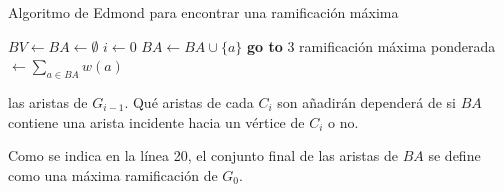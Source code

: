 \documentclass[10pt,a5paper]{book}
\begin{document}
\vfill
\pagebreak
\begin{algorithm}[H]
\caption{Algoritmo de Edmond para encontrar una ramificación máxima}
\BlankLine
\dontprintsemicolon
$BV \leftarrow BA \leftarrow \emptyset$\;
$i \leftarrow 0$\;
{
}
{
}
$BA \leftarrow BA \cup \{a\}$\;
\textbf{go to} 3\;
{
  ramificación máxima ponderada $\leftarrow \sum_{a \in BA}^{} w(a)$
}
\end{algorithm}

las aristas de $G_{i-1}$. Qué aristas de cada $C_i$ son añadirán dependerá de si $BA$ contiene una arista incidente hacia un vértice de $C_i$ o no.

Como se indica en la línea 20, el conjunto final de las aristas de $BA$ se define como una máxima ramificación de $G_0$.
\end{document}
